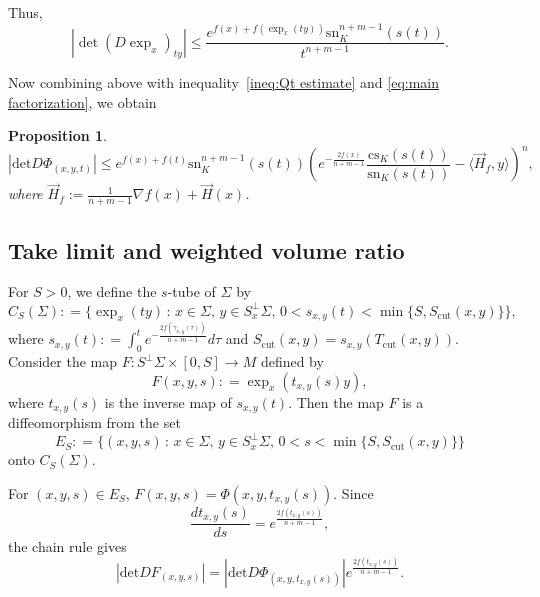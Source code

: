 \documentclass[psamsfonts]{amsart}
\newtheorem{prop}[thm]{Proposition}
\theoremstyle{definition}
\theoremstyle{remark}
\numberwithin{equation}{section}
\begin{document}
    
    Thus,
    $$|\operatorname{det} ( D \exp_x)_{ty}|  \leq \frac{e^{f(x) +f ( \exp_x ( ty))} \mathrm{sn}_K^{n+m-1}(s(t))}{t^{n+m-1}}.$$


    Now combining above with  inequality~\eqref{ineq:Qt estimate} and %
    \eqref{eq:main factorization},
    we obtain
\begin{prop}
    \begin{equation}
        |\mathrm{det} D\Phi_{(  x ,   y ,   t)}|\leq e^{f(x) +f (t)} \mathrm{sn}_K^{n+m-1} (s(t))  \left(e^{-\frac{2f(x)}{n+m-1}} \frac{\mathrm{cs}_K(s(t))}{\mathrm{sn}_K(s(t))} - \langle \vec{H}_f , y \rangle \right)^n, 
        \end{equation}
where $\vec{H}_f := \frac{1}{n+m-1} \nabla f(x) + \vec H(x)$. 
\end{prop}

    \subsection{Take limit and weighted volume ratio}
For $S>0$, we define the $s$-tube of $\Sigma$ by
$$
    C_S (\Sigma ) : = \{\exp_x(ty) \, : \, x \in \Sigma, \, y \in S_x^\perp \Sigma, \, 0 < s_{x,y }(t) < \min \{S, S_{\mathrm{cut}}(x,y)\}\},
$$
where $s_{x,y}(t) : = \int_0^t e^{-\frac{2f(\gamma_{x,y}(\tau))}{n+m-1}} d\tau$ and  $S_{\mathrm{cut}}(x,y) = s_{x,y}(T_{\mathrm{cut}}(x,y))$.
Consider the map $F : S^\perp \Sigma \times [0,S] \to M$ defined by
$$F(x,y,s) : = \exp_x(t_{x,y}(s)y),$$
where $t_{x,y}(s)$ is the inverse map of $s_{x,y}(t)$.
Then the map $F$ is a  diffeomorphism from the set
$$E_S : = \{(x,y,s)  \, : \, x \in \Sigma, \,y \in S_x^\perp \Sigma , \,0 < s< \min\{S, S_{\mathrm{cut}} (x,y)\} \}$$
onto $C_S(\Sigma)$.


For $(x,y,s ) \in E_S$, $F(x,y,s) = \Phi(x,y,t_{x,y}(s)).$
Since 
$$
    \frac{d t_{x,y}(s)}{ds} = e^{\frac{2f(t_{x,y}(s))}{n+m-1}},
$$
the chain rule gives
$$|\mathrm{det} DF_{(x,y,s)}| = |\mathrm{det} D\Phi_{(x,y,t_{x,y}(s))}|e^{\frac{2f(t_{x,y}(s))}{n+m-1}}.$$
\end{document}
